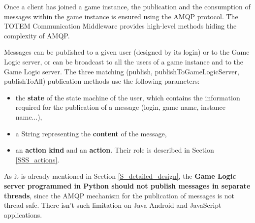 Once a client has joined a game instance, the publication and the
consumption of messages within the game instance is ensured using the
AMQP protocol. The TOTEM Communication Middleware provides high-level
methods hiding the complexity of AMQP.

Messages can be published to a given user (designed by its login) or
to the Game Logic server, or can be broadcast to all the users of a
game instance and to the Game Logic server. The three matching
(publish, publishToGameLogicServer, publishToAll)
publication methods use the following parameters:
\begin{itemize}
\item the \textbf{state} of the state machine of the user, which
  contains the information required for the publication of a
  message (login, game name, instance name...),
\item a String representing the \textbf{content} of the message,
\item an \textbf{action kind} and an \textbf{action}. Their role is described 
in Section \ref{SSS_actions}. 
\end{itemize}

As it is already mentioned in Section \ref{S_detailed_design}, the
\textbf{Game Logic server programmed in Python should not publish
  messages in separate threads}, since the AMQP mechanism for the
publication of messages is not thread-safe. There isn't such
limitation on Java Android and JavaScript applications.


